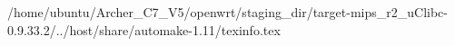 /home/ubuntu/Archer_C7_V5/openwrt/staging_dir/target-mips_r2_uClibc-0.9.33.2/../host/share/automake-1.11/texinfo.tex